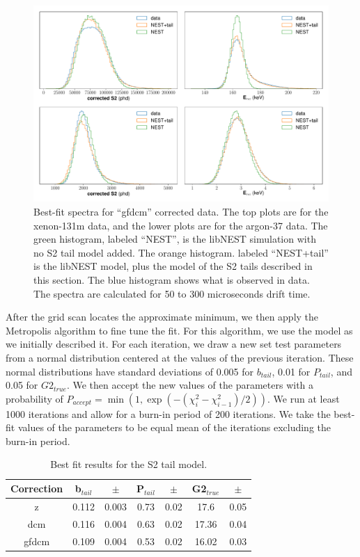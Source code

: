 \begin{figure}[h!]
  \centering
  \includegraphics[width=\textwidth]{Figures/S2tail_hists_gfdcm.pdf}
\caption{Best-fit spectra for ``gfdcm'' corrected data. The top plots are for the xenon-131m data, and the lower plots are for the argon-37 data. The green histogram, labeled ``NEST'', is the libNEST simulation with no S2 tail model added. The orange histogram. labeled ``NEST+tail'' is the libNEST model, plus the model of the S2 tails described in this section. The blue histogram shows what is observed in data. The spectra are calculated for 50 to 300 microseconds drift time.  }
\label{fig:s2bestfit_spec_gfdcm}
\end{figure}

After the grid scan locates the approximate minimum, we then apply the Metropolis algorithm to fine tune the fit.\cite{metropolis_1,metropolis_2} For this algorithm, we use the model as we initially described it. For each iteration, we draw a new set test parameters from a normal distribution centered at the values of the previous iteration. These normal distributions have standard deviations of  0.005 for $b_{tail}$, 0.01 for $P_{tail}$, and 0.05 for $G2_{true}$. We then accept the new values of the parameters with a probability of $P_{accept}=\min(1,\exp(-(\chi_i^2-\chi_{i-1}^2)/2))$. We run at least 1000 iterations and allow for a burn-in period of 200 iterations. We take the best-fit values of the parameters to be equal mean of the iterations excluding the burn-in period.

\begin{table}[h!]
\centering
    \begin{tabular}{ c | c | c | c | c | c | c }
    \hline
    Correction & b$_{tail}$ & $\pm$ & P$_{tail}$ & $\pm$  & G2$_{true}$ & $\pm$ \\
    \hline \hline
    z & 0.112 & 0.003 & 0.73 & 0.02 & 17.6 & 0.05\\
    \hline
    dcm & 0.116 & 0.004 & 0.63 & 0.02 & 17.36 & 0.04 \\
    \hline
    gfdcm & 0.109 & 0.004 & 0.53 & 0.02 & 16.02 & 0.03 \\
    \hline
    \end{tabular}
    \caption{Best fit results for the S2 tail model.}
    \label{tab:s2bestfit}
\end{table}

